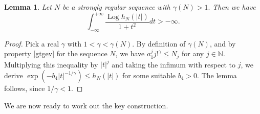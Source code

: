 \documentclass[a4paper]{amsart}
\theoremstyle{plain}
\newtheorem{lem}[subsubsection]{Lemma}
\theoremstyle{definition}
\theoremstyle{remark}
\DeclareMathOperator{\Log}{Log}
\begin{document}
\begin{lem}\label{logint}
Let $ N $ be a strongly regular sequence with $ \gamma(N)>1. $ Then we have
\begin{equation*}
\int_{-\infty}^{+\infty}\frac{\Log h_N(\vert t\vert)}{1+t^2}dt>-\infty.
\end{equation*}
\end{lem}
\begin{proof}
Pick a real $ \gamma $ with $ 1<\gamma<\gamma(N) $. By definition of $ \gamma(N) $, and
by property \eqref{gtgev} for the sequence $ N $, we have 
$ a_1^j j!^\gamma\leq N_j $ for any $ j\in\mathbb{N} $. Multiplying this inequality by $ \vert t\vert^j $ and taking the infimum with respect to $ j $, we derive $ \exp(-b_4\vert t\vert^{-1/\gamma})\leq h_N(\vert t\vert) $ for some suitable $ b_4>0 $. The lemma follows, since $ 1/\gamma<1 $.
\end{proof}

We are now ready to work out the key construction.
\end{document}
